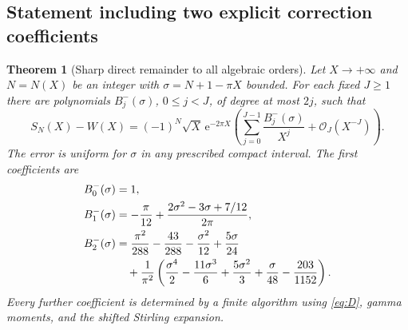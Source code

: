 \documentclass[11pt,a4paper]{article}
\newtheorem{theorem}{Theorem}[section]
\theoremstyle{definition}
\numberwithin{equation}{section}
\newcommand{\ee}{\mathrm{e}}
\newcommand{\Oh}{\mathcal O}
\begin{document}
\subsection{Statement including two explicit correction coefficients}
\begin{theorem}[Sharp direct remainder to all algebraic orders]
\label{thm:sharp}
Let $X\to+\infty$ and $N=N(X)$ be an integer with
$\sigma=N+1-\pi X$ bounded. For each fixed $J\ge1$ there are polynomials
$B_j^-(\sigma)$, $0\le j<J$, of degree at most $2j$, such that
\begin{equation}
 S_N(X)-W(X)=(-1)^N\sqrt X\,\ee^{-2\pi X}
  \left(\sum_{j=0}^{J-1}\frac{B_j^-(\sigma)}{X^j}
                  +\Oh_J(X^{-J})\right).
 \label{eq:sharpall}
\end{equation}
The error is uniform for $\sigma$ in any prescribed compact interval.
The first coefficients are
\begin{align}
 B_0^-(\sigma)&=1,\label{eq:B0}\\
 B_1^-(\sigma)&=-\frac\pi{12}
       +\frac{2\sigma^2-3\sigma+7/12}{2\pi},\label{eq:B1}\\
 B_2^-(\sigma)&=\frac{\pi^2}{288}-\frac{43}{288}
              -\frac{\sigma^2}{12}+\frac{5\sigma}{24}
 \notag\\
 &\quad+\frac1{\pi^2}\left(
 \frac{\sigma^4}{2}-\frac{11\sigma^3}{6}
 +\frac{5\sigma^2}{3}+\frac{\sigma}{48}-\frac{203}{1152}\right).
 \label{eq:B2}
\end{align}
Every further coefficient is determined by a finite algorithm using
\eqref{eq:D}, gamma moments, and the shifted Stirling expansion.
\end{theorem}
\end{document}
